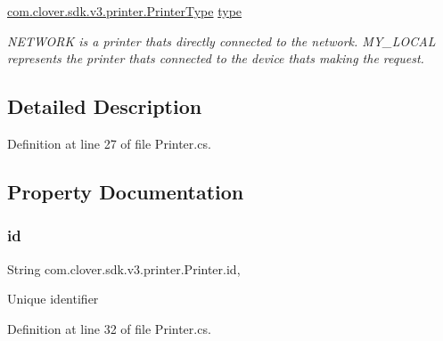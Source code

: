 \begin{DoxyCompactItemize}
\hyperlink{namespacecom_1_1clover_1_1sdk_1_1v3_1_1printer_aaa495f52394f8a733ba9bb4650cb1583}{com.\+clover.\+sdk.\+v3.\+printer.\+Printer\+Type} \hyperlink{classcom_1_1clover_1_1sdk_1_1v3_1_1printer_1_1_printer_ab36bf7ec4bd09ce0ee2562f26b79475c}{type}
\begin{DoxyCompactList}\small\item\em N\+E\+T\+W\+O\+RK is a printer that\textquotesingle{}s directly connected to the network. M\+Y\+\_\+\+L\+O\+C\+AL represents the printer that\textquotesingle{}s connected to the device that\textquotesingle{}s making the request. \end{DoxyCompactList}\end{DoxyCompactItemize}


\subsection{Detailed Description}


Definition at line 27 of file Printer.\+cs.



\subsection{Property Documentation}
\mbox{\label{classcom_1_1clover_1_1sdk_1_1v3_1_1printer_1_1_printer_a6c1405e0e17d04064909c54fff864c52}} 
\subsubsection{\texorpdfstring{id}{id}}
{\footnotesize\ttfamily String com.\+clover.\+sdk.\+v3.\+printer.\+Printer.\+id\hspace{0.3cm}{\ttfamily [get]}, {\ttfamily [set]}}



Unique identifier 



Definition at line 32 of file Printer.\+cs.

\mbox{\label{classcom_1_1clover_1_1sdk_1_1v3_1_1printer_1_1_printer_a25c08767d6d7cb105bf451f458e97c70}} 
